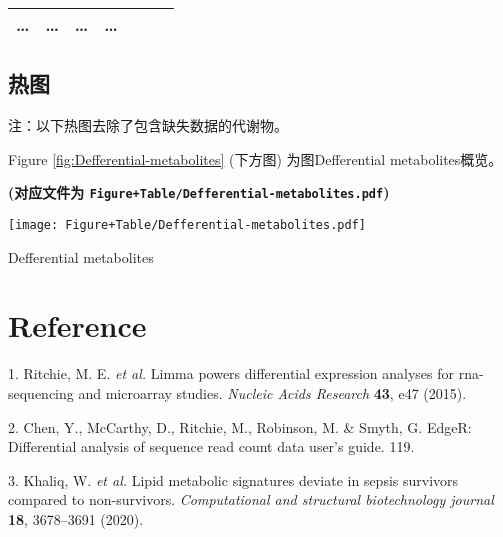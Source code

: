 \documentclass[
]{article}
\newenvironment{cslreferences}%
  {}%
  {\par}
\begin{document}
\begin{longtable}[]{@{}lllllll@{}}
\begin{minipage}[t]{0.12\columnwidth}
\ldots{}\strut
\end{minipage} & \begin{minipage}[t]{0.12\columnwidth}\raggedright
\ldots{}\strut
\end{minipage} & \begin{minipage}[t]{0.12\columnwidth}\raggedright
\ldots{}\strut
\end{minipage} & \begin{minipage}[t]{0.12\columnwidth}\raggedright
\ldots{}\strut
\end{minipage}\tabularnewline
\bottomrule
\end{longtable}

\hypertarget{ux70edux56fe}{%
\subsection{热图}\label{ux70edux56fe}}

注：以下热图去除了包含缺失数据的代谢物。

Figure \ref{fig:Defferential-metabolites} (下方图) 为图Defferential metabolites概览。

\textbf{(对应文件为 \texttt{Figure+Table/Defferential-metabolites.pdf})}

\def\@captype{figure}
\begin{center}
\texttt{[image: Figure+Table/Defferential-metabolites.pdf]}
\caption{Defferential metabolites}\label{fig:Defferential-metabolites}
\end{center}

\hypertarget{bibliography}{%
\section*{Reference}\label{bibliography}}

\hypertarget{refs}{}
\begin{cslreferences}
\leavevmode\hypertarget{ref-LimmaPowersDiRitchi2015}{}%
1. Ritchie, M. E. \emph{et al.} Limma powers differential expression analyses for rna-sequencing and microarray studies. \emph{Nucleic Acids Research} \textbf{43}, e47 (2015).

\leavevmode\hypertarget{ref-EdgerDifferenChen}{}%
2. Chen, Y., McCarthy, D., Ritchie, M., Robinson, M. \& Smyth, G. EdgeR: Differential analysis of sequence read count data user's guide. 119.

\leavevmode\hypertarget{ref-LipidMetabolicKhaliq2020}{}%
3. Khaliq, W. \emph{et al.} Lipid metabolic signatures deviate in sepsis survivors compared to non-survivors. \emph{Computational and structural biotechnology journal} \textbf{18}, 3678--3691 (2020).
\end{cslreferences}
\end{document}
